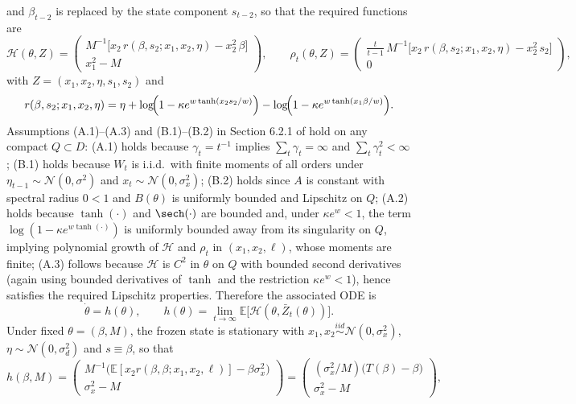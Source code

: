 \documentclass[11pt]{article}
\begin{document}
and $\beta_{t-2}$ is replaced by the state component $s_{t-2}$, so that the required functions are
\[
\mathcal H(\theta,Z)=
\begin{pmatrix}
M^{-1}\big[x_{2}\,r(\beta,s_{2};x_1,x_2,\eta)-x_2^2\,\beta\big]\\
x_1^2-M
\end{pmatrix},
\qquad
\rho_t(\theta,Z)=
\begin{pmatrix}
\frac{t}{t-1}\,M^{-1}\big[x_{2}\,r(\beta,s_{2};x_1,x_2,\eta)-x_2^2\,s_{2}\big]\\
0
\end{pmatrix},
\]
with $Z=(x_1,x_2,\eta,s_1, s_2)$ and
\[
r(\beta,s_2;x_1,x_2,\eta)
=\eta+\log\!\Bigl(1-\kappa e^{w\tanh(x_2 s_2/w)}\Bigr)-\log\!\Bigl(1-\kappa e^{w\tanh(x_1 \beta/w)}\Bigr).
\]
Assumptions (A.1)–(A.3) and (B.1)–(B.2) in Section 6.2.1 of \cite{GeorgeWEvans2001} hold on any compact $Q\subset D$: (A.1) holds because $\gamma_t=t^{-1}$ implies $\sum_t\gamma_t=\infty$ and $\sum_t\gamma_t^2<\infty$; 
(B.1) holds because $W_t$ is i.i.d.\ with finite moments of all orders under $\eta_{t-1}\sim\mathcal N(0,\sigma^2)$ and $x_t\sim \mathcal N(0,\sigma_x^2)$; (B.2) holds since $A$ is constant with spectral radius $0<1$ and $B(\theta)$ is uniformly bounded and Lipschitz on $Q$; (A.2) holds because $\tanh(\cdot)$ and $\sech(\cdot)$ are bounded and, under $\kappa e^{w}<1$, the term $\log(1-\kappa e^{w\tanh(\cdot)})$ is uniformly bounded away from its singularity on $Q$, implying polynomial growth of $\mathcal H$ and $\rho_t$ in $(x_1,x_2,\ell)$, whose moments are finite; (A.3) follows because $\mathcal H$ is $C^2$ in $\theta$ on $Q$ with bounded second derivatives (again using bounded derivatives of $\tanh$ and the restriction $\kappa e^{w}<1$), hence satisfies the required Lipschitz properties. Therefore the associated ODE is
\[
\dot\theta = h(\theta),\qquad h(\theta)=\lim_{t\to\infty}\mathbb E\big[\mathcal H(\theta,\bar Z_t(\theta))\big].
\]
Under fixed $\theta=(\beta,M)$, the frozen state is stationary with $x_1,x_2\stackrel{iid}{\sim}\mathcal N(0,\sigma_x^2)$, $\eta\sim\mathcal N(0,\sigma_d^2)$ and $s\equiv \beta$, so that
\[
h(\beta,M)=
\begin{pmatrix}
M^{-1}\big(\mathbb E[x_2 r(\beta,\beta;x_1,x_2,\ell)]-\beta\sigma_x^2\big)\\
\sigma_x^2-M
\end{pmatrix}
=
\begin{pmatrix}
(\sigma_x^2/M)\big(T(\beta)-\beta\big)\\
\sigma_x^2-M
\end{pmatrix},
\]
\end{document}
